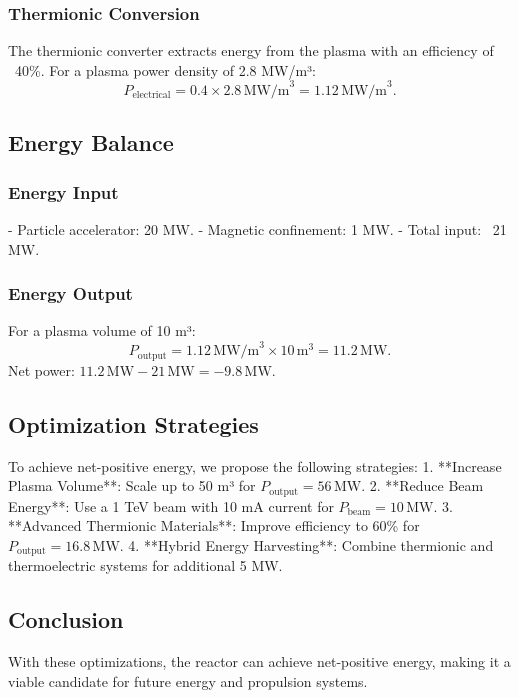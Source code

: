 \documentclass[12pt, a4paper]{article}
\begin{document}
\subsubsection{Thermionic Conversion}
The thermionic converter extracts energy from the plasma with an efficiency of ~40\%. For a plasma power density of 2.8 MW/m³:
\[
P_{\text{electrical}} = 0.4 \times 2.8 \, \text{MW/m}^3 = 1.12 \, \text{MW/m}^3.
\]

\subsection{Energy Balance}
\subsubsection{Energy Input}
- Particle accelerator: 20 MW.
- Magnetic confinement: 1 MW.
- Total input: ~21 MW.

\subsubsection{Energy Output}
For a plasma volume of 10 m³:
\[
P_{\text{output}} = 1.12 \, \text{MW/m}^3 \times 10 \, \text{m}^3 = 11.2 \, \text{MW}.
\]
Net power: \( 11.2 \, \text{MW} - 21 \, \text{MW} = -9.8 \, \text{MW} \).

\subsection{Optimization Strategies}
To achieve net-positive energy, we propose the following strategies:
1. **Increase Plasma Volume**: Scale up to 50 m³ for \( P_{\text{output}} = 56 \, \text{MW} \).
2. **Reduce Beam Energy**: Use a 1 TeV beam with 10 mA current for \( P_{\text{beam}} = 10 \, \text{MW} \).
3. **Advanced Thermionic Materials**: Improve efficiency to 60\% for \( P_{\text{output}} = 16.8 \, \text{MW} \).
4. **Hybrid Energy Harvesting**: Combine thermionic and thermoelectric systems for additional 5 MW.

\subsection{Conclusion}
With these optimizations, the reactor can achieve net-positive energy, making it a viable candidate for future energy and propulsion systems.

\end{document}

